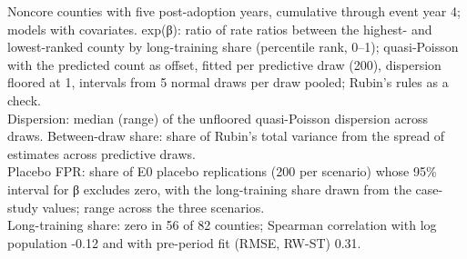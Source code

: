 \begin{table}
\begin{minipage}{\linewidth}
Noncore counties with five post-adoption years, cumulative through event year 4; models with covariates. exp(β): ratio of rate ratios between the highest- and lowest-ranked county by long-training share (percentile rank, 0–1); quasi-Poisson with the predicted count as offset, fitted per predictive draw (200), dispersion floored at 1, intervals from 5 normal draws per draw pooled; Rubin's rules as a check.\\
Dispersion: median (range) of the unfloored quasi-Poisson dispersion across draws. Between-draw share: share of Rubin's total variance from the spread of estimates across predictive draws.\\
Placebo FPR: share of E0 placebo replications (200 per scenario) whose 95\% interval for β excludes zero, with the long-training share drawn from the case-study values; range across the three scenarios.\\
Long-training share: zero in 56 of 82 counties; Spearman correlation with log population -0.12 and with pre-period fit (RMSE, RW-ST) 0.31.\\
\end{minipage}
\end{table}

